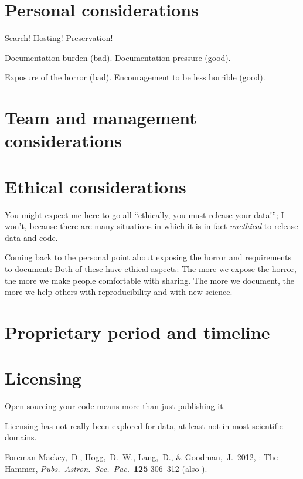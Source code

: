 \documentclass[12pt,twoside,pdftex]{article}
\begin{document}
\section{Personal considerations}

Search! Hosting! Preservation!

Documentation burden (bad). Documentation pressure (good).

Exposure of the horror (bad). Encouragement to be less horrible (good).

\section{Team and management considerations}

\section{Ethical considerations}

You might expect me here to go all ``ethically, you must release your
data!''; I won't, because there are many situations in which it is in
fact \emph{unethical} to release data and code.

Coming back to the personal point about exposing the horror and
requirements to document: Both of these have ethical aspects: The more
we expose the horror, the more we make people comfortable with
sharing. The more we document, the more we help others with
reproducibility and with new science.

\section{Proprietary period and timeline}

\section{Licensing}

Open-sourcing your code means more than just publishing it.

Licensing has not really been explored for data, at least not in most
scientific domains.

\clearpage
{}\theendnotes

\clearpage
\raggedright
\begin{thebibliography}{}
  Foreman-Mackey,~D., Hogg,~D.~W., Lang,~D., \& Goodman,~J.\ 2012,
  : The  Hammer,
  \textit{Pubs.\ Astron.\ Soc.\ Pac.}\ \textbf{125} 306--312
  (also ).
\end{thebibliography}
\end{document}
